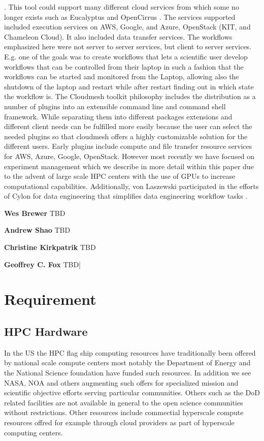 \documentclass[utf8]{FrontiersinVancouver} %
\begin{document}
\citep{las-04-ftp-journal}
\citep{las-03-ftp}.
This tool could support many different cloud services from which some no longer exists such as Eucalyptus \cite{eucalyptus} and OpenCirrus \cite{opencirrus}. The services supported included execution services on AWS, Google, and Azure, OpenStack (KIT, and Chameleon Cloud). It also included data transfer services. The workflows emphasized here were not server to server services, but client to server services. E.g. one of the goals was to create workflows that lets a scientific user develop workflows that can be controlled from their laptop in such a fashion that the workflows can be started and monitored from the Laptop, allowing also the shutdown of the laptop and restart while after restart finding out in which state the workflow is. 
The Cloudmesh toolkit philosophy includes the distribution as a number of plugins into an extensible command line and command shell framework. While separating them into different packages extensions and different client needs can be fulfilled more easily because the user can select the needed plugins so that cloudmesh offers a highly customizable solution for the different users. Early plugins include compute and file transfer resource services for AWS, Azure, Google, OpenStack. However  most recently we have focused on experiment management which we describe in more detail within this paper due to the advent of large scale HPC centers with the use of GPUs to increase computational capabilities. 
Additionally, von Laszewski participated in the efforts of Cylon for data engineering that simplifies data engineering workflow tasks \citep{cylon,cylon-radical}. 

{\bf Wes Brewer} TBD

{\bf Andrew Shao} TBD

{\bf Christine Kirkpatrik} TBD

{\bf Geoffrey C. Fox} TBD|


\section{Requirement}

\subsection{HPC Hardware}

In the US the HPC flag ship computing resources have traditionally
been offered by national scale compute centers most notably the
Department of Energy and the National Science foundation have funded
such resources. In addition we see NASA, NOA and others augmenting
such offers for specialized mission and scientific objective efforts
serving particular communities. Others such as the DoD related
facilities are not available in general to the open science
communities without restrictions. Other resources include commectial
hyperscale compute resources offred for example through cloud
providers as part of hyperscale computing centers.
\end{document}
